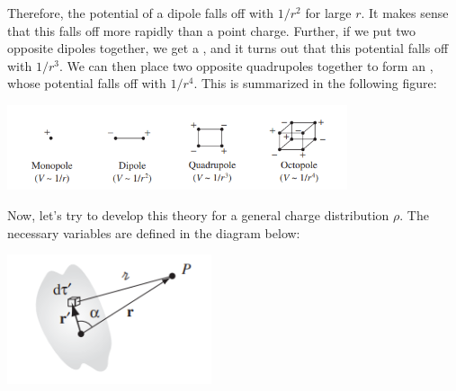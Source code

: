 Therefore, the potential of a dipole falls off with $1/r^2$ for large $r$. It makes sense that this falls off more rapidly than a point charge. Further, if we put two opposite dipoles together, we get a , and it turns out that this potential falls off with $1/r^3$. We can then place two opposite quadrupoles together to form an , whose potential falls off with $1/r^4$. This is summarized in the following figure:

\begin{center}
    \includegraphics[width=10cm]{Electrodynamics/images/fig3.27.PNG}
\end{center}

Now, let's try to develop this theory for a general charge distribution $\rho$. The necessary variables are defined in the diagram below:

\begin{center}
    \includegraphics[width=6cm]{Electrodynamics/images/fig3.28.PNG}
\end{center}


